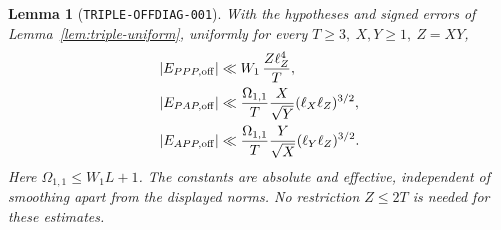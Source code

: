 \documentclass[11pt]{article}
\newtheorem{lemma}{Lemma}
\begin{document}
\begin{lemma}[\texttt{TRIPLE-OFFDIAG-001}]\label{lem:triple-offdiag}
With the hypotheses and signed errors of Lemma~\ref{lem:triple-uniform},
uniformly for every \(T\geq3,\ X,Y\geq1,\ Z=XY\),
\begin{align}
 |E_{PPP,{\rm off}}|&\ll
 W_1\,\frac{Z\ell_Z^4}{T},\label{eq:triple-cubic-sharp}\\
 |E_{PAP,{\rm off}}|&\ll
 \frac{\Omega_{1,1}}{T}\frac{X}{\sqrt Y}
       (\ell_X\ell_Z)^{3/2},\label{eq:triple-mixed-sharp}\\
 |E_{APP,{\rm off}}|&\ll
 \frac{\Omega_{1,1}}{T}\frac{Y}{\sqrt X}
       (\ell_Y\ell_Z)^{3/2}.\notag
\end{align}
Here \(\Omega_{1,1}\leq W_1L+1\). The constants are absolute and
effective, independent of smoothing apart from the displayed norms.
No restriction \(Z\leq2T\) is needed for these estimates.
\end{lemma}
\end{document}

